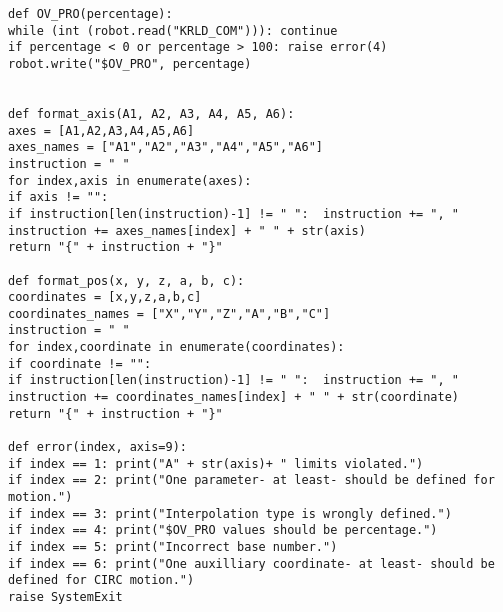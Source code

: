 \begin{lstlisting}[language=terCmd]
def OV_PRO(percentage):
while (int (robot.read("KRLD_COM"))): continue
if percentage < 0 or percentage > 100: raise error(4)
robot.write("$OV_PRO", percentage)


def format_axis(A1, A2, A3, A4, A5, A6):
axes = [A1,A2,A3,A4,A5,A6]
axes_names = ["A1","A2","A3","A4","A5","A6"]
instruction = " "
for index,axis in enumerate(axes):
if axis != "":
if instruction[len(instruction)-1] != " ":	instruction += ", "
instruction += axes_names[index] + " " + str(axis)
return "{" + instruction + "}"

def format_pos(x, y, z, a, b, c):
coordinates = [x,y,z,a,b,c]
coordinates_names = ["X","Y","Z","A","B","C"]
instruction = " "
for index,coordinate in enumerate(coordinates):
if coordinate != "":
if instruction[len(instruction)-1] != " ":	instruction += ", "
instruction += coordinates_names[index] + " " + str(coordinate)
return "{" + instruction + "}"

def error(index, axis=9):
if index == 1: print("A" + str(axis)+ " limits violated.")
if index == 2: print("One parameter- at least- should be defined for motion.")
if index == 3: print("Interpolation type is wrongly defined.")
if index == 4: print("$OV_PRO values should be percentage.")
if index == 5: print("Incorrect base number.")
if index == 6: print("One auxilliary coordinate- at least- should be defined for CIRC motion.")
raise SystemExit
\end{lstlisting}

\newpage
